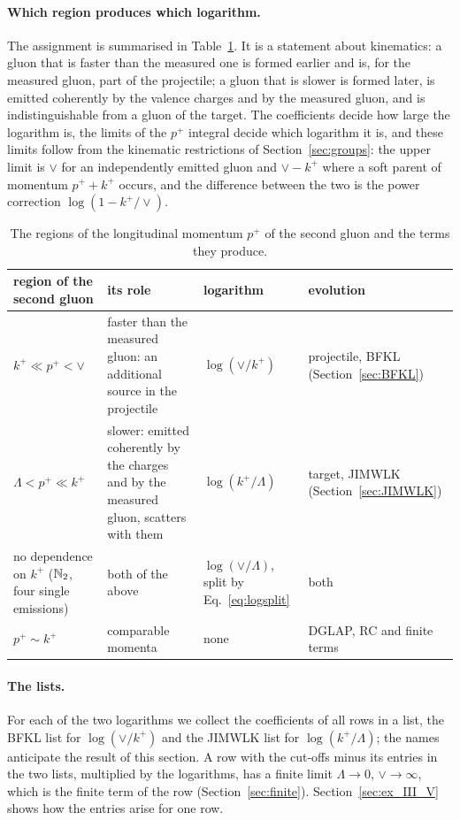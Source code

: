 \paragraph{Which region produces which logarithm.} The assignment is summarised in Table~\ref{tab:logregions}. It is a statement about kinematics: a gluon that is faster than the measured one is formed earlier and is, for the measured gluon, part of the projectile; a gluon that is slower is formed later, is emitted coherently by the valence charges and by the measured gluon, and is indistinguishable from a gluon of the target. The coefficients decide how large the logarithm is, the limits of the $p^+$ integral decide which logarithm it is, and these limits follow from the kinematic restrictions of Section~\ref{sec:groups}: the upper limit is $\vee$ for an independently emitted gluon and $\vee-k^+$ where a soft parent of momentum $p^++k^+$ occurs, and the difference between the two is the power correction $\log(1-k^+/\vee)$.
\begin{table}[t]
\centering
\renewcommand{\arraystretch}{1.25}
\footnotesize
\begin{tabular}{@{}>{\raggedright\arraybackslash}p{}>{\raggedright\arraybackslash}p{}>{\raggedright\arraybackslash}p{}>{\raggedright\arraybackslash}p{}@{}}
\toprule
region of the second gluon & its role & logarithm & evolution\\
\midrule
$k^+\ll p^+<\vee$ & faster than the measured gluon: an additional source in the projectile & $\log(\vee/k^+)$ & projectile, BFKL (Section~\ref{sec:BFKL})\\
$\Lambda<p^+\ll k^+$ & slower: emitted coherently by the charges and by the measured gluon, scatters with them & $\log(k^+/\Lambda)$ & target, JIMWLK (Section~\ref{sec:JIMWLK})\\
no dependence on $k^+$ ($\mathbb{N}_2$, four single emissions) & both of the above & $\log(\vee/\Lambda)$, split by Eq.~\eqref{eq:logsplit} & both\\
$p^+\sim k^+$ & comparable momenta & none & DGLAP, RC and finite terms\\
\bottomrule
\end{tabular}
\caption{The regions of the longitudinal momentum $p^+$ of the second gluon and the terms they produce.}
\label{tab:logregions}
\end{table}

\paragraph{The lists.} For each of the two logarithms we collect the coefficients of all rows in a list, the BFKL list for $\log(\vee/k^+)$ and the JIMWLK list for $\log(k^+/\Lambda)$; the names anticipate the result of this section. A row with the cut-offs minus its entries in the two lists, multiplied by the logarithms, has a finite limit $\Lambda\to0$, $\vee\to\infty$, which is the finite term of the row (Section~\ref{sec:finite}). Section~\ref{sec:ex_III_V} shows how the entries arise for one row.

